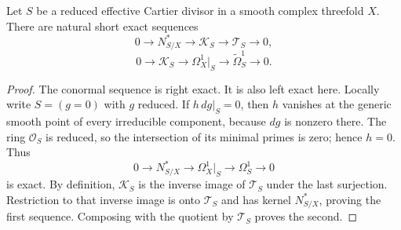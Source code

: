 \begin{proposition}
\label{prop:missing-cotangent-filtration}
Let $S$ be a reduced effective Cartier divisor in a smooth complex
threefold $X$.  There are natural short exact sequences
\[
0\longrightarrow N^*_{S/X}\longrightarrow\mathscr K_S
\longrightarrow\mathscr T_S\longrightarrow0,
\]
\[
0\longrightarrow\mathscr K_S\longrightarrow\Omega_X^1|_S
\longrightarrow\widetilde\Omega_S^1\longrightarrow0.
\]
\end{proposition}

\begin{proof}
The conormal sequence is right exact.  It is also left exact here.  Locally
write $S=(g=0)$ with $g$ reduced.  If $h\,dg|_S=0$, then $h$ vanishes at the
generic smooth point of every irreducible component, because $dg$ is nonzero
there.  The ring $\mathcal O_S$ is reduced, so the intersection of its
minimal primes is zero; hence $h=0$.  Thus
\[
0\to N^*_{S/X}\to\Omega_X^1|_S\to\Omega_S^1\to0
\]
is exact.  By definition, $\mathscr K_S$ is the inverse image of
$\mathscr T_S$ under the last surjection.  Restriction to that inverse image
is onto $\mathscr T_S$ and has kernel $N^*_{S/X}$, proving the first
sequence.  Composing with the quotient by $\mathscr T_S$ proves the second.
\end{proof}

